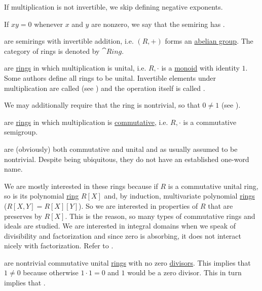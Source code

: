 \begin{definition}
\begin{thmenum}[resume=def:semiring]
    If multiplication is not invertible, we skip defining negative exponents.

     If \( xy = 0 \) whenever \( x \) and \( y \) are nonzero, we say that the semiring has .

      are semirings with invertible addition, i.e. \( (R, +) \) forms an \hyperref[def:abelian_group]{abelian group}. The category of rings is denoted by \( \cat{Ring} \).

      are \hyperref[def:semiring/ring]{rings} in which multiplication is unital, i.e. \( R, \cdot \) is a \hyperref[def:unital_magma/associative]{monoid} with identity \( 1 \). Some authors define all rings to be unital. Invertible elements under multiplication are called  (see ) and the operation itself is called .

    We may additionally require that the ring is nontrivial, so that \( 0 \neq 1 \) (see ).

      are \hyperref[def:semiring/ring]{rings} in which multiplication is \hyperref[def:magma/commutative]{commutative}, i.e. \( R, \cdot \) is a commutative semigroup.

      are (obviously) both commutative and unital and as usually assumed to be nontrivial. Despite being ubiquitous, they do not have an established one-word name.

    We are mostly interested in these rings because if \( R \) is a commutative unital ring, so is its polynomial \hyperref[def:algebra_of_polynomials]{ring} \( R[X] \) and, by induction, multivariate polynomial \hyperref[def:multivariate_polynomial]{rings} (\( R[X, Y] = R[X][Y] \)). So we are interested in properties of \( R \) that are preserves by \( R[X] \). This is the reason, so many types of commutative rings and ideals are studied. We are interested in integral domains when we speak of divisibility and factorization and since zero is absorbing, it does not interact nicely with factorization. Refer to .

      are nontrivial commutative unital \hyperref[def:semiring/commutative_unital_ring]{rings} with no zero \hyperref[def:commutative_ring_division]{divisors}. This implies that \( 1 \neq 0 \) because otherwise \( 1 \cdot 1 = 0 \) and \( 1 \) would be a zero divisor. This in turn implies that .


\end{thmenum}
\end{definition}
